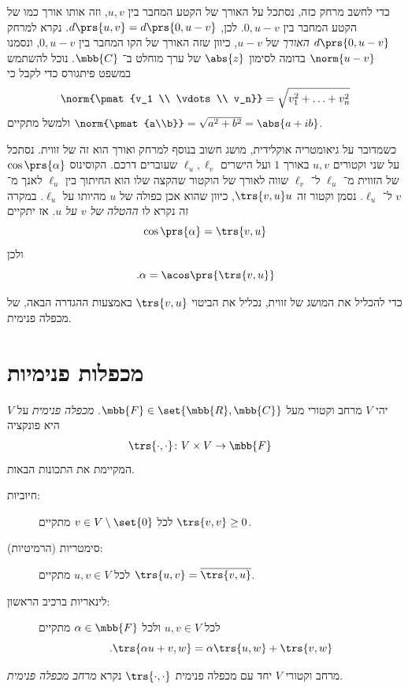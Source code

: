 \documentclass[a4paper,10pt,twoside,openany]{book}
\begin{document}
כדי לחשב מרחק כזה, נסתכל על האורך של הקטע המחבר בין
$u,v$,
וזה אותו אורך כמו של הקטע המחבר בין
$0,u-v$.
לכן,
$d\prs{u,v} = d\prs{0,u-v}$.
נקרא למרחק
$d\prs{0,u-v}$
\emph{האורך}
של
$u-v$,
כיוון שזה האורך של הקו המחבר בין
$0,u-v$,
ונסמנו
$\norm{u-v}$
בדומה לסימון
$\abs{z}$
של ערך מוחלט ב־%
$\mbb{C}$.
נוכל להשתמש במשפט פיתגורס כדי לקבל כי
\[\norm{\pmat{v_1 \\ \vdots \\ v_n}} = \sqrt{v_1^2 + \ldots + v_n^2}\]
ולמשל מתקיים
$\norm{\pmat{a\\b}} = \sqrt{a^2 + b^2} = \abs{a + ib}$.

כשמדובר על גיאומטריה אוקלידית, מושג חשוב בנוסף למרחק ואורך הוא זה של זווית. נסתכל על שני וקטורים
$u,v$
באורך
$1$
ועל הישרים
$\ell_u, \ell_v$
שעוברים דרכם.
הקוסינוס
$\cos\prs{\alpha}$
של הזווית מ־%
$\ell_u$
ל־%
$\ell_v$
שווה לאורך של הוקטור שהקצה שלו הוא החיתוך בין
$\ell_u$
לאנך מ־%
$v$
ל־%
$\ell_u$.
נסמן וקטור זה
$\trs{v,u} u$,
כיוון שהוא אכן כפולה של
$u$
מהיותו על
$\ell_u$.
במקרה זה נקרא לו
\emph{ההטלה של
$v$
על
$u$}.
אז יתקיים
\[\cos\prs{\alpha} = \trs{v,u}\]
ולכן
\[\text{.} \alpha = \acos\prs{\trs{v,u}}\]

כדי להכליל את המושג של זווית, נכליל את הביטוי
$\trs{v,u}$
באמצעות ההגדרה הבאה, של מכפלה פנימית.

\section{מכפלות פנימיות}

\begin{definition}
יהי
$V$
מרחב וקטורי מעל
$\mbb{F} \in \set{\mbb{R}, \mbb{C}}$.
\emph{מכפלה פנימית}
על
$V$
היא פונקציה
\begin{align*}
\trs{\cdot,\cdot} \colon V \times V &\to \mbb{F}
\end{align*}
המקיימת את התכונות הבאות.
\begin{description}
\item[חיוביות:]
לכל
$v \in V \setminus \set{0}$
מתקיים
$\trs{v,v} \geq 0$.

\item[סימטריות (הרמיטיות):]
לכל
$u,v \in V$
מתקיים
$\trs{u,v} = \overline{\trs{v,u}}$.

\item[לינאריות ברכיב הראשון:]
לכל
$u,v \in V$
ולכל
$\alpha \in \mbb{F}$
מתקיים
\[\text{.}\trs{\alpha u + v, w} = \alpha\trs{u,w} + \trs{v,w}\]
\end{description}

מרחב וקטורי
$V$
יחד עם מכפלה פנימית
$\trs{\cdot,\cdot}$
נקרא
\emph{מרחב מכפלה פנימית}.
\end{definition}
\end{document}

